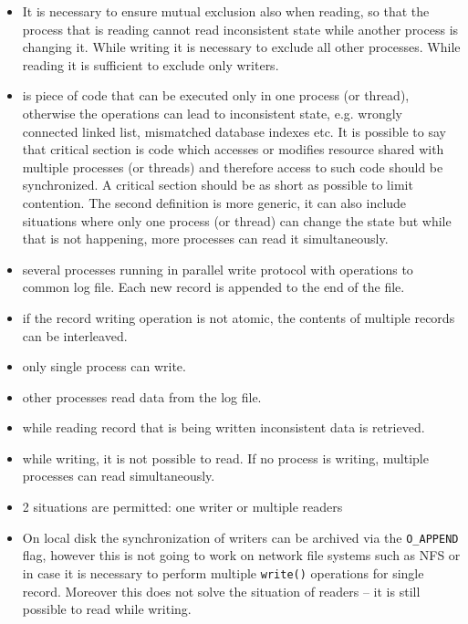 \begin{itemize}
\item It is necessary to ensure mutual exclusion also when reading,
so that the process that is reading cannot read inconsistent state while
another process is changing it. While writing it is necessary to exclude
all other processes. While reading it is sufficient to exclude only writers.
\item {} is piece of code that can be executed
only in one process (or thread), otherwise the operations can lead to
inconsistent state, e.g. wrongly connected linked list, mismatched database
indexes etc. It is possible to say that critical section is code which accesses
or modifies resource shared with multiple processes (or threads) and therefore
access to such code should be synchronized. A critical section should be as
short as possible to limit contention. The second definition is more generic,
it can also include situations where only one process (or thread) can change the
state but while that is not happening, more processes can read it
simultaneously.
\end{itemize}


\begin{slide}
\begin{itemize}
\item several processes running in parallel write protocol with operations
to common log file. Each new record is appended to the end of the file.
\item if the record writing operation is not atomic, the contents of multiple
records can be interleaved.
\item only single process can write.
\item other processes read data from the log file.
\item while reading record that is being written inconsistent data is retrieved.
\item while writing, it is not possible to read. If no process is writing,
multiple processes can read simultaneously.
\end{itemize}
\end{slide}

\begin{itemize}
\item 2 situations are permitted: one writer or multiple readers
\item On local disk the synchronization of writers can be archived via the
\texttt{O\_APPEND} flag, however this is not going to work on network file
systems such as NFS or in case it is necessary to perform multiple
\texttt{write()} operations for single record. Moreover this does not solve
the situation of readers -- it is still possible to read while writing.
\end{itemize}

